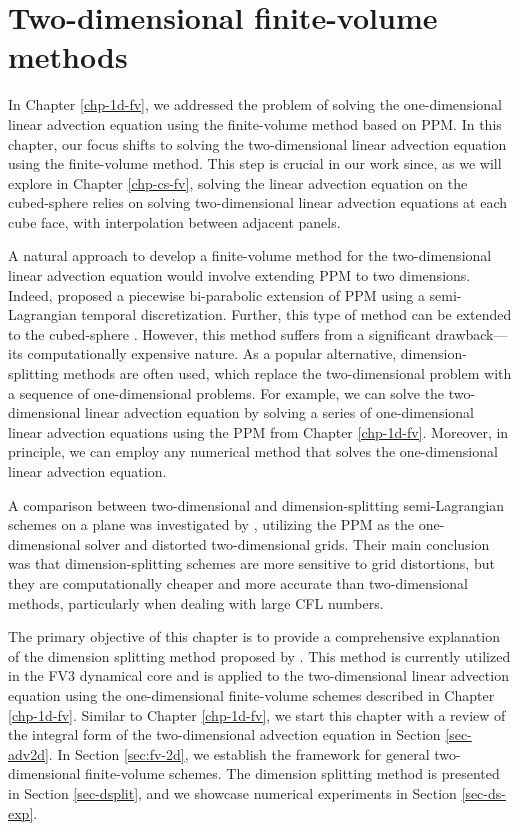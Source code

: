 \chapter{Two-dimensional finite-volume methods}
\label{chp-2d-fv}
In Chapter \ref{chp-1d-fv}, we addressed the problem of solving the one-dimensional
linear advection equation using the finite-volume method based on PPM. In this chapter, our focus shifts to solving the two-dimensional 
linear advection equation using the finite-volume method. This step is crucial in our work since, as we will explore in Chapter 
\ref{chp-cs-fv}, solving the linear advection equation on the cubed-sphere relies on solving two-dimensional linear advection equations 
at each cube face, with interpolation between adjacent panels.

A natural approach to develop a finite-volume method for the two-dimensional linear advection equation would involve extending PPM to 
two dimensions. Indeed, \citet{rancic:1992} proposed a piecewise bi-parabolic extension of PPM using a semi-Lagrangian temporal 
discretization. 
Further, this type of method can be extended to the cubed-sphere \citep{lauritzen:2010}.
However, this method suffers from a significant drawback—its computationally expensive nature. As a popular alternative, 
dimension-splitting methods are often used, which replace the two-dimensional problem with a sequence of one-dimensional problems. For 
example, we can solve the two-dimensional linear advection equation by solving a series of one-dimensional linear advection equations 
using the PPM from Chapter \ref{chp-1d-fv}. Moreover, in principle, we can employ any numerical method that solves the one-dimensional 
linear advection equation.

A comparison between two-dimensional and dimension-splitting semi-Lagrangian schemes on a plane was investigated by \citet{chen:2017}, 
utilizing the PPM as the one-dimensional solver and distorted two-dimensional grids. Their main conclusion was that dimension-splitting 
schemes are more sensitive to grid distortions, but they are computationally cheaper and more accurate than two-dimensional methods, 
particularly when dealing with large CFL numbers.

The primary objective of this chapter is to provide a comprehensive explanation of the dimension splitting method proposed by 
\citet{lin:1996}. This method is currently utilized in the FV3 dynamical core and is applied to the two-dimensional linear advection 
equation using the one-dimensional finite-volume schemes described in Chapter \ref{chp-1d-fv}.
Similar to Chapter \ref{chp-1d-fv}, we start this chapter with a review of the integral form of the two-dimensional advection 
equation in Section \ref{sec-adv2d}. In Section \ref{sec:fv-2d}, we establish the framework for general two-dimensional finite-volume 
schemes. The dimension splitting method is presented in Section \ref{sec-dsplit}, and we showcase numerical experiments in Section 
\ref{sec-ds-exp}.
